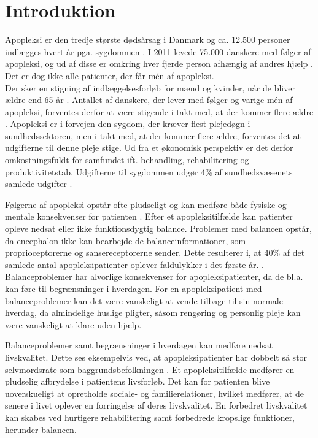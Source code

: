 \chapter{Introduktion}
Apopleksi er den tredje største dødsårsag i Danmark og ca. 12.500 personer indlægges hvert år pga. sygdommen \cite{Hjernesagen2015a}. I 2011 levede 75.000 danskere med følger af apopleksi, og ud af disse er omkring hver fjerde person afhængig af andres hjælp \cite{Hjernesagen2015a}. Det er dog ikke alle patienter, der får mén af apopleksi. \\
Der sker en stigning af indlæggelsesforløb for mænd og kvinder, når de bliver ældre end 65 år \cite{Sundhedsstyrelsen2011}. Antallet af danskere, der lever med følger og varige mén af apopleksi, forventes derfor at være stigende i takt med, at der kommer flere ældre \cite{Sagen2014}. Apopleksi er i forvejen den sygdom, der kræver flest plejedøgn i sundhedssektoren, men i takt med, at der kommer flere ældre, forventes det at udgifterne til denne pleje stige. Ud fra et økonomisk perspektiv er det derfor omkostningsfuldt for samfundet ift. behandling, rehabilitering og produktivitetstab.  Udgifterne til sygdommen udgør 4\% af sundhedsvæsenets samlede udgifter \cite{Hjernesagen2015a, Kruuse2014}.

Følgerne af apopleksi opstår ofte pludseligt og kan medføre både fysiske og mentale konsekvenser for patienten \cite{Muus2008}. Efter et apopleksitilfælde kan patienter opleve nedsat eller ikke funktionsdygtig balance. Problemer med balancen opstår, da encephalon ikke kan bearbejde de balanceinformationer, som proprioceptorerne og sansereceptorerne sender. \cite{Karnath2003} Dette resulterer i, at 40\% af det samlede antal apopleksipatienter oplever faldulykker i det første år. \cite{Association2006}. 
Balanceproblemer har alvorlige konsekvenser for apopleksipatienter, da de bl.a. kan føre til begrænsninger i hverdagen. \cite{Muus2008,Nichols1997} For en apopleksipatient med balanceproblemer kan det være vanskeligt at vende tilbage til sin normale hverdag, da almindelige huslige pligter, såsom rengøring og personlig pleje kan være vanskeligt at klare uden hjælp. \cite{Sundhedsstyrelsen2010}

Balanceproblemer samt begrænsninger i hverdagen kan medføre nedsat livskvalitet. Dette ses eksempelvis ved, at apopleksipatienter har dobbelt så stor selvmordsrate som baggrundsbefolkningen \cite{Sundhedsstyrelsen2010}. Et apopleksitilfælde medfører en pludselig afbrydelse i patientens livsforløb. Det kan for patienten blive uoverskueligt at opretholde sociale- og familierelationer, hvilket medfører, at de senere i livet oplever en forringelse af deres livskvalitet. En forbedret livskvalitet kan skabes ved hurtigere rehabilitering samt forbedrede kropslige funktioner, herunder balancen. \cite{Sundhedsstyrelsen2010}

